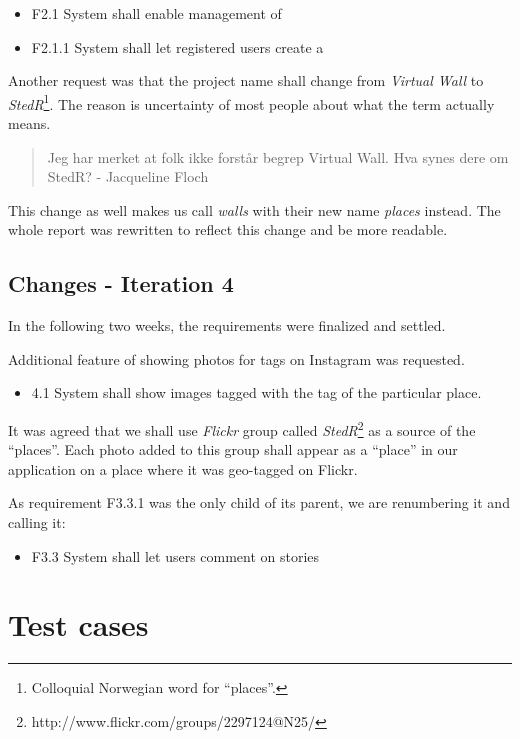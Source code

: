 \documentclass[11pt]{book}
\begin{document}
\begin{itemize}
  \item F2.1 System shall enable management of \wallentityp
  \item F2.1.1 System shall let registered users create a \wallentitys
\end{itemize}

Another request was that the project name shall change from \emph{Virtual Wall} to \emph{StedR}\footnote{Colloquial Norwegian word for ``places''.}. The reason is uncertainty of most people about what the term actually means.

\begin{quote}
Jeg har merket at folk ikke forstår begrep Virtual Wall. Hva synes dere om StedR? - Jacqueline Floch
\end{quote}

This change as well makes us call \emph{walls} with their new name \emph{places} instead. The whole report was rewritten to reflect this change and be more readable.

\section{Changes - Iteration 4}\label{changes---iteration-4}

In the following two weeks, the requirements were finalized and settled.

Additional feature of showing photos for tags on Instagram was requested.

\begin{itemize}
  \item 4.1 System shall show images tagged with the tag of the particular
  place.
\end{itemize}

It was agreed that we shall use \emph{Flickr} group called \emph{StedR}\footnote{http://www.flickr.com/groups/2297124@N25/} as a source of the ``places''. Each photo added to this group shall appear as a ``place'' in our application on a place where it was geo-tagged on Flickr.

As requirement F3.3.1 was the only child of its parent, we are renumbering it and calling it:

\begin{itemize}
  \item F3.3 System shall let users comment on stories
\end{itemize}


\chapter{Test cases}\label{appendix:testcases}
\end{document}
